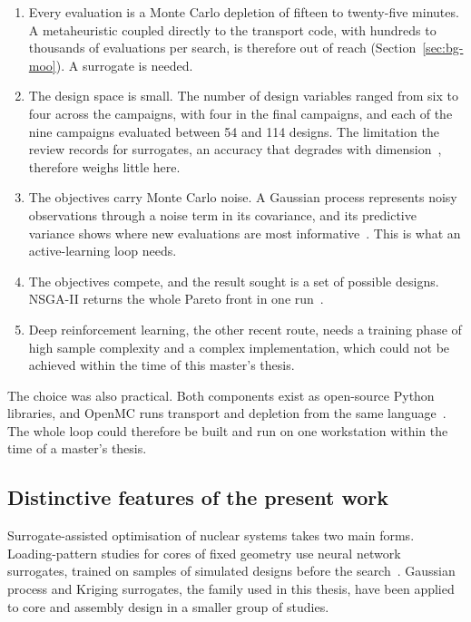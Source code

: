 \begin{enumerate}
  \item Every evaluation is a Monte Carlo depletion of fifteen to
        twenty-five minutes. A metaheuristic coupled directly to the
        transport code, with hundreds to thousands of evaluations per
        search, is therefore out of reach
        (Section~\ref{sec:bg-moo}). A surrogate is needed.

  \item The design space is small. The number of design variables ranged
        from six to four across the campaigns, with four in the final
        campaigns, and each of the nine campaigns evaluated between 54 and
        114 designs. The limitation the review records for surrogates, an
        accuracy that degrades with dimension~\cite{jin_2011}, therefore
        weighs little here.

  \item The objectives carry Monte Carlo noise. A Gaussian process
        represents noisy observations through a noise term in its
        covariance, and its predictive variance shows where new
        evaluations are most informative~\cite{rasmussen_gp_2006}. This
        is what an active-learning loop needs.

  \item The objectives compete, and the result sought is a set of
        possible designs. NSGA-II returns the whole Pareto front in one
        run~\cite{deb_nsga2_2002}.

  \item Deep reinforcement learning, the other recent route, needs a
        training phase of high sample complexity and a complex
        implementation, which could not be achieved within the time of
        this master's thesis.
\end{enumerate}

The choice was also practical. Both components exist as open-source
Python libraries, and OpenMC runs transport and depletion from the same
language~\cite{romano_openmc_2015,romano_2021_depletion}. The whole loop
could therefore be built and run on one workstation within the time of
a master's thesis.

\subsection{Distinctive features of the present work}
\label{sec:lit-opt-distinct}

Surrogate-assisted optimisation of nuclear systems takes two main forms.
Loading-pattern studies for cores of fixed geometry use neural network
surrogates, trained on samples of simulated designs before the
search~\cite{whyte_2020,wan_2022}. Gaussian process and Kriging
surrogates, the family used in this thesis, have been applied to core
and assembly design in a smaller group of studies.

